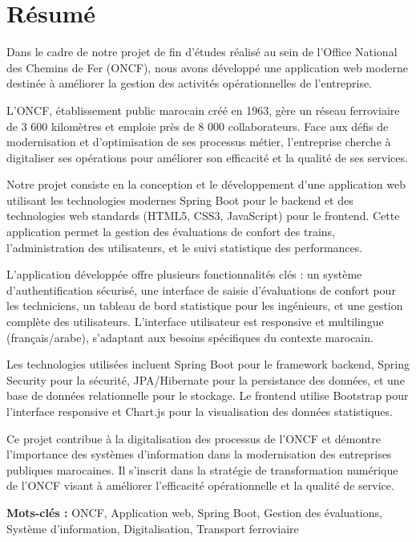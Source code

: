 \chapter*{Résumé}

Dans le cadre de notre projet de fin d'études réalisé au sein de l'Office National des Chemins de Fer (ONCF), nous avons développé une application web moderne destinée à améliorer la gestion des activités opérationnelles de l'entreprise.

L'ONCF, établissement public marocain créé en 1963, gère un réseau ferroviaire de 3 600 kilomètres et emploie près de 8 000 collaborateurs. Face aux défis de modernisation et d'optimisation de ses processus métier, l'entreprise cherche à digitaliser ses opérations pour améliorer son efficacité et la qualité de ses services.

Notre projet consiste en la conception et le développement d'une application web utilisant les technologies modernes Spring Boot pour le backend et des technologies web standards (HTML5, CSS3, JavaScript) pour le frontend. Cette application permet la gestion des évaluations de confort des trains, l'administration des utilisateurs, et le suivi statistique des performances.

L'application développée offre plusieurs fonctionnalités clés : un système d'authentification sécurisé, une interface de saisie d'évaluations de confort pour les techniciens, un tableau de bord statistique pour les ingénieurs, et une gestion complète des utilisateurs. L'interface utilisateur est responsive et multilingue (français/arabe), s'adaptant aux besoins spécifiques du contexte marocain.

Les technologies utilisées incluent Spring Boot pour le framework backend, Spring Security pour la sécurité, JPA/Hibernate pour la persistance des données, et une base de données relationnelle pour le stockage. Le frontend utilise Bootstrap pour l'interface responsive et Chart.js pour la visualisation des données statistiques.

Ce projet contribue à la digitalisation des processus de l'ONCF et démontre l'importance des systèmes d'information dans la modernisation des entreprises publiques marocaines. Il s'inscrit dans la stratégie de transformation numérique de l'ONCF visant à améliorer l'efficacité opérationnelle et la qualité de service.

\textbf{Mots-clés :} ONCF, Application web, Spring Boot, Gestion des évaluations, Système d'information, Digitalisation, Transport ferroviaire

\vfill

\newpage